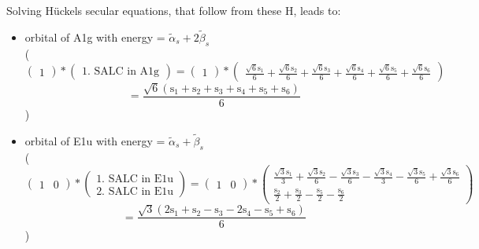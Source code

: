 \documentclass[12pt,a4paper]{article}
\begin{document}
Solving Hückels secular equations, that follow from these H, leads to:
\begin{itemize}
\item orbital of A1g with energy = 
                                $\tilde{\alpha}_{s} + 2 \tilde{\beta}_{s}$ \\
( 
$$
\begin{pmatrix}1\end{pmatrix} * \left(\begin{array}{c}\text{1. SALC in A1g}\end{array}\right) = \begin{pmatrix}1\end{pmatrix} * \begin{pmatrix}\frac{\sqrt{6} \text{s}_{1}}{6} + \frac{\sqrt{6} \text{s}_{2}}{6} + \frac{\sqrt{6} \text{s}_{3}}{6} + \frac{\sqrt{6} \text{s}_{4}}{6} + \frac{\sqrt{6} \text{s}_{5}}{6} + \frac{\sqrt{6} \text{s}_{6}}{6}\end{pmatrix} 
 $$ $$ = \frac{\sqrt{6} \left(\text{s}_{1} + \text{s}_{2} + \text{s}_{3} + \text{s}_{4} + \text{s}_{5} + \text{s}_{6}\right)}{6} 
 $$ 
 )

\item orbital of E1u with energy = 
                                $\tilde{\alpha}_{s} + \tilde{\beta}_{s}$ \\
( 
$$
\begin{pmatrix}1 & 0\end{pmatrix} * \left(\begin{array}{c}\text{1. SALC in E1u} \\ \text{2. SALC in E1u}\end{array}\right) = \begin{pmatrix}1 & 0\end{pmatrix} * \begin{pmatrix}\frac{\sqrt{3} \text{s}_{1}}{3} + \frac{\sqrt{3} \text{s}_{2}}{6} - \frac{\sqrt{3} \text{s}_{3}}{6} - \frac{\sqrt{3} \text{s}_{4}}{3} - \frac{\sqrt{3} \text{s}_{5}}{6} + \frac{\sqrt{3} \text{s}_{6}}{6}\\\frac{\text{s}_{2}}{2} + \frac{\text{s}_{3}}{2} - \frac{\text{s}_{5}}{2} - \frac{\text{s}_{6}}{2}\end{pmatrix} 
 $$ $$ = \frac{\sqrt{3} \left(2 \text{s}_{1} + \text{s}_{2} - \text{s}_{3} - 2 \text{s}_{4} - \text{s}_{5} + \text{s}_{6}\right)}{6} 
 $$ 
 )


\end{itemize}
\end{document}
